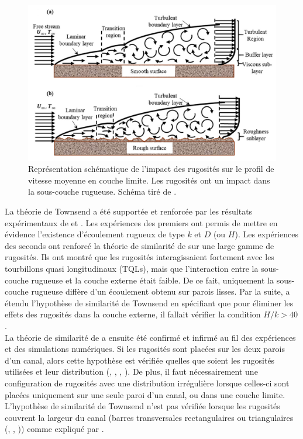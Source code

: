 \begin{figure}[!hbtp]
    \centering
    \includegraphics[width=\linewidth]{Chap1/Pictures/Ecoulement_rugueux/roughness_sublayer_Kadivar.png}
    \caption{Représentation schématique de l'impact des rugosités sur le profil de vitesse moyenne en couche limite. Les rugosités ont un impact dans la sous-couche rugueuse. Schéma tiré de \cite{Kadivar2021}.}
    \label{fig/roughness_sublayer}
\end{figure}

\vspace{1.25cm}
La théorie de Townsend a été supportée et renforcée par les résultats expérimentaux de \cite{Perry1969} et \cite{Raupach1991}. Les expériences des premiers ont permis de mettre en évidence l'existence d'écoulement rugueux de type $k$ et $D$ (ou $H$). Les expériences des seconds ont renforcé la théorie de similarité de \cite{Townsend1976} sur une large gamme de rugosités. Ils ont montré que les rugosités interagissaient fortement avec les tourbillons quasi longitudinaux (TQLs), mais que l'interaction entre la sous-couche rugueuse et la couche externe était faible. De ce fait, uniquement la sous-couche rugueuse diffère d'un écoulement obtenu sur parois lisses. Par la suite, \cite{Jimenez2004} a étendu l'hypothèse de similarité de Townsend en spécifiant que pour éliminer les effets des rugosités dans la couche externe, il fallait vérifier la condition $H/k>40$.\\

La théorie de similarité de \cite{Townsend1976} a ensuite été confirmé et infirmé au fil des expériences et des simulations numériques. Si les rugosités sont placées sur les deux parois d'un canal, alors cette hypothèse est vérifiée quelles que soient les rugosités utilisées et leur distribution (\cite{Lee2002}, \cite{Ashrafian2004}, \cite{Bakken2005}, \cite{Krogstad2005}). De plus, il faut nécessairement une configuration de rugosités avec une distribution irrégulière lorsque celles-ci sont placées uniquement sur une seule paroi d'un canal, ou dans une couche limite. L'hypothèse de similarité de Townsend n'est pas vérifiée lorsque les rugosités couvrent la largeur du canal (barres transversales rectangulaires ou triangulaires (\cite{Djenidi1999}, \cite{Krogstad2005}, \cite{Lee2007})) comme expliqué par \cite{Antonia2001}.

